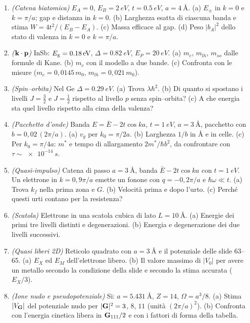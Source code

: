 \documentclass[11pt,a4paper]{article}
\begin{document}
\begin{enumerate}[label=\textbf{E\arabic*.}, leftmargin=2.3em, itemsep=2pt]
\item \emph{(Catena biatomica)} $E_A=0$, $E_B=\SI{2}{eV}$, $t=\SI{0.5}{eV}$, $a=\SI{4}{\angstrom}$. (a) $E_\pm$ in $k=0$ e $k=\pi/a$; gap e distanza in $k=0$.
(b) Larghezza esatta di ciascuna banda e stima $W=4t^2/(E_B-E_A)$. (c) Massa efficace al gap. (d) Peso $|b_A|^2$ dello stato di valenza in $k=0$ e
$k=\pi/a$.
\item \emph{($\mathbf k\cdot\mathbf p$)} InSb: $E_{\mathrm g}=\SI{0.18}{eV}$, $\Delta=\SI{0.82}{eV}$, $E_P=\SI{20}{eV}$. (a) $m_c$, $m_{lh}$, $m_{so}$ dalle formule di Kane.
(b) $m_c$ con il modello a due bande. (c) Confronta con le misure ($m_c=0{,}0145\,m_0$, $m_{lh}=0{,}021\,m_0$).
\item \emph{(Spin--orbita)} Nel Ge $\Delta=\SI{0.29}{eV}$. (a) Trova $\lambda\hbar^2$. (b) Di quanto si spostano i livelli $J=\frac32$ e $J=\frac12$ rispetto al
livello $p$ senza spin--orbita? (c) A che energia sta quel livello rispetto alla cima della valenza?
\item \emph{(Pacchetto d'onde)} Banda $E=\bar E-2t\cos ka$, $t=\SI{1}{eV}$, $a=\SI{3}{\angstrom}$, pacchetto con $b=0{,}02\,(2\pi/a)$. (a) $v_g$ per
$k_0=\pi/2a$. (b) Larghezza $1/b$ in \AA{} e in celle. (c) Per $k_0=\pi/4a$: $m^*$ e tempo di allargamento $2m^*/\hbar b^2$, da confrontare con
$\tau\sim\SI{e-14}{s}$.
\item \emph{(Quasi-impulso)} Catena di passo $a=\SI{3}{\angstrom}$, banda $\bar E-2t\cos ka$ con $t=\SI{1}{eV}$. Un elettrone in $k=0{,}9\pi/a$ emette un
fonone con $q=-0{,}2\pi/a$ e $\hbar\omega\ll t$. (a) Trova $k_f$ nella prima zona e $G$. (b) Velocità prima e dopo l'urto. (c) Perché questi urti
contano per la resistenza?
\item \emph{(Scatola)} Elettrone in una scatola cubica di lato $L=\SI{10}{\angstrom}$. (a) Energie dei primi tre livelli distinti e degenerazioni.
(b) Energia e degenerazione dei due livelli successivi.
\item \emph{(Quasi liberi 2D)} Reticolo quadrato con $a=\SI{3}{\angstrom}$ e il potenziale delle slide 63--65. (a) $E_X$ ed $E_M$ dell'elettrone libero.
(b) Il valore massimo di $|V_0|$ per avere un metallo secondo la condizione della slide e secondo la stima accurata ($E_X/3$).
\item \emph{(Ione nudo e pseudopotenziale)} Si: $a=\SI{5.431}{\angstrom}$, $Z=14$, $\Omega=a^3/8$. (a) Stima $|V_{\mathbf G}|$ del potenziale nudo per
$|\mathbf G|^2=3$, $8$, $11$ (unità $(2\pi/a)^2$). (b) Confronta con l'energia cinetica libera in $\mathbf G_{111}/2$ e con i fattori di forma della tabella.

\end{enumerate}
\end{document}
